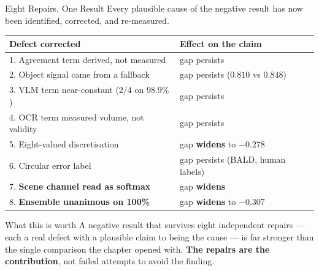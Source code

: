 \documentclass[aspectratio=169,11pt]{beamer}
\begin{document}
\begin{frame}{Eight Repairs, One Result}
\small
Every plausible cause of the negative result has now been identified, corrected, and re-measured.
\vspace{1mm}
\begin{center}
\scriptsize
\begin{tabular}{@{}l l@{}}
\toprule
\textbf{Defect corrected} & \textbf{Effect on the claim} \\
\midrule
1. Agreement term derived, not measured & gap persists \\
2. Object signal came from a fallback & gap persists ($0.810$ vs $0.848$) \\
3. VLM term near-constant ($2/4$ on $98.9\%$) & gap persists \\
4. OCR term measured volume, not validity & gap persists \\
5. Eight-valued discretisation & gap \textbf{widens} to $-0.278$ \\
6. Circular error label & gap persists (BALD, human labels) \\
7. \textbf{Scene channel read as softmax} & gap \textbf{widens} \\
8. \textbf{Ensemble unanimous on 100\%} & gap \textbf{widens} to $\mathbf{-0.307}$ \\
\bottomrule
\end{tabular}
\end{center}
\vspace{1mm}
\begin{exampleblock}{\small What this is worth}
\footnotesize A negative result that survives eight independent repairs --- each a real defect with a plausible claim to being the cause --- is far stronger than the single comparison the chapter opened with. \textbf{The repairs are the contribution}, not failed attempts to avoid the finding.
\end{exampleblock}
\end{frame}
\end{document}
